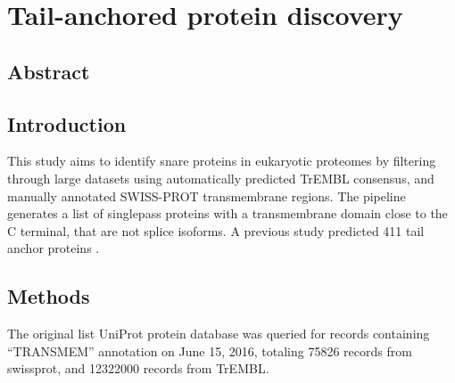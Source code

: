 \chapter{Tail-anchored protein discovery} %
\section{Abstract}

\section{Introduction}
This study aims to identify \gls{snare} proteins in eukaryotic proteomes by filtering through large datasets using automatically predicted TrEMBL consensus, and manually annotated SWISS-PROT transmembrane regions. The pipeline generates a list of singlepass proteins with a transmembrane domain close to the C terminal, that are not splice isoforms. A previous study predicted 411 tail anchor proteins \cite{Kalbfleisch2007}.

\section{Methods}
The original list UniProt protein database was queried for records containing ``TRANSMEM'' annotation on June 15, 2016, totaling 75826 records from swissprot, and 12322000 records from TrEMBL.

